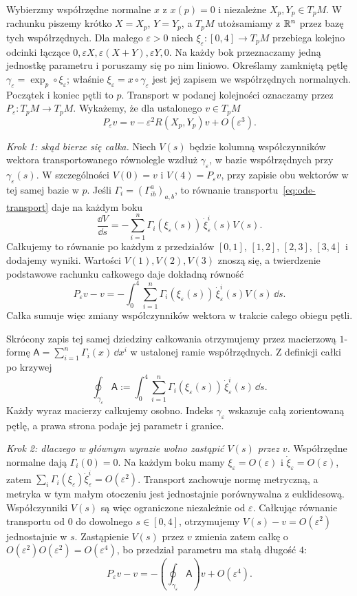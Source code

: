 \begin{uwaga}\label{uwaga:holonomia}
Wybierzmy współrzędne normalne $x$ z $x(p)=0$
i niezależne $X_p,Y_p\in T_pM$.
W rachunku piszemy krótko $X=X_p$, $Y=Y_p$,
a $T_pM$ utożsamiamy z $\mathbb{R}^n$ przez bazę tych współrzędnych.
Dla małego $\varepsilon>0$ niech
$\xi_\varepsilon:[0,4]\to T_pM$ przebiega kolejno
odcinki łączące
$0,\varepsilon X,\varepsilon(X+Y),\varepsilon Y,0$.
Na każdy bok przeznaczamy jedną jednostkę parametru
i poruszamy się po nim liniowo.
Określamy zamkniętą pętlę
$\gamma_\varepsilon=\exp_p\circ\xi_\varepsilon$;
właśnie $\xi_\varepsilon=x\circ\gamma_\varepsilon$
jest jej zapisem we współrzędnych normalnych.
Początek i koniec pętli to $p$.
Transport w podanej kolejności oznaczamy przez
$P_\varepsilon:T_pM\to T_pM$.
Wykażemy, że dla ustalonego $v\in T_pM$
\[
 P_\varepsilon v=v-\varepsilon^2R(X_p,Y_p)v+O(\varepsilon^3).
\]

\emph{Krok 1: skąd bierze się całka.}
Niech $V(s)$ będzie kolumną współczynników wektora
transportowanego równolegle wzdłuż $\gamma_\varepsilon$,
w bazie współrzędnych przy $\gamma_\varepsilon(s)$.
W szczególności $V(0)=v$ i $V(4)=P_\varepsilon v$,
przy zapisie obu wektorów w tej samej bazie w $p$.
Jeśli $\Gamma_i=(\Gamma^a_{ib})_{a,b}$, to równanie
transportu~\eqref{eq:ode-transport} daje na każdym boku
\[
 \frac{\dd V}{\dd s}
 =-\sum_{i=1}^n
       \Gamma_i(\xi_\varepsilon(s))\,\dot\xi_\varepsilon^i(s)V(s).
\]
Całkujemy to równanie po każdym z przedziałów
$[0,1]$, $[1,2]$, $[2,3]$, $[3,4]$ i dodajemy wyniki.
Wartości $V(1),V(2),V(3)$ znoszą się,
a twierdzenie podstawowe rachunku całkowego daje dokładną równość
\[
 P_\varepsilon v-v
 =-\int_0^4\sum_{i=1}^n
       \Gamma_i(\xi_\varepsilon(s))\,\dot\xi_\varepsilon^i(s)V(s)\,\dd s.
\]
Całka sumuje więc zmiany współczynników wektora
w trakcie całego obiegu pętli.

Skrócony zapis tej samej dziedziny całkowania
otrzymujemy przez macierzową $1$-formę
$\mathsf A=\sum_{i=1}^n\Gamma_i(x)\,\dd x^i$
w ustalonej ramie współrzędnych. Z definicji całki po krzywej
\[
 \oint_{\gamma_\varepsilon}\mathsf A
 :=\int_0^4\sum_{i=1}^n
       \Gamma_i(\xi_\varepsilon(s))\,\dot\xi_\varepsilon^i(s)\,\dd s.
\]
Każdy wyraz macierzy całkujemy osobno.
Indeks $\gamma_\varepsilon$ wskazuje całą zorientowaną pętlę,
a prawa strona podaje jej parametr i granice.

\emph{Krok 2: dlaczego w głównym wyrazie wolno zastąpić $V(s)$ przez $v$.}
Współrzędne normalne dają $\Gamma_i(0)=0$.
Na każdym boku mamy $\xi_\varepsilon=O(\varepsilon)$
i $\dot\xi_\varepsilon=O(\varepsilon)$, zatem
$\sum_i\Gamma_i(\xi_\varepsilon)\dot\xi_\varepsilon^i
=O(\varepsilon^2)$.
Transport zachowuje normę metryczną, a metryka w tym małym
otoczeniu jest jednostajnie porównywalna z euklidesową.
Współczynniki $V(s)$ są więc ograniczone niezależnie od $\varepsilon$.
Całkując równanie transportu od $0$ do dowolnego $s\in[0,4]$,
otrzymujemy $V(s)-v=O(\varepsilon^2)$ jednostajnie w $s$.
Zastąpienie $V(s)$ przez $v$ zmienia zatem całkę
o $O(\varepsilon^2)O(\varepsilon^2)=O(\varepsilon^4)$,
bo przedział parametru ma stałą długość $4$:
\[
 P_\varepsilon v-v
 =-\left(\oint_{\gamma_\varepsilon}\mathsf A\right)v
       +O(\varepsilon^4).
\]


\end{uwaga}

